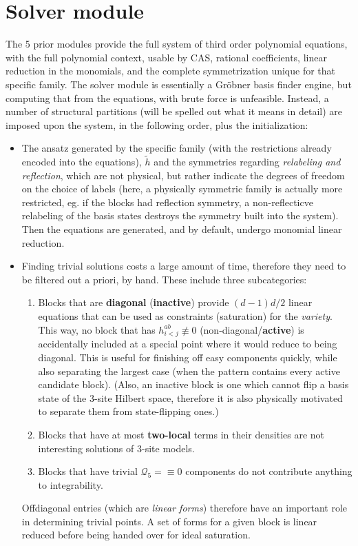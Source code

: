 \documentclass[a4paper, 11pt, twoside, onecolumn]{article}
\newcommand{\Q}{\mathcal{Q}}
\newcommand{\htil}{\tilde{h}}
\begin{document}
\section{Solver module}
The 5 prior modules provide the full system of third order polynomial equations, with the full polynomial context, usable by CAS, rational coefficients, linear reduction in the monomials, and the complete symmetrization unique for that specific family. The solver module is essentially a Gröbner basis finder engine, but computing that from the equations, with brute force is unfeasible. Instead, a number of structural partitions (will be spelled out what it means in detail) are imposed upon the system, in the following order, plus the initialization:
\begin{itemize}
    \item The ansatz generated by the specific family (with the restrictions already encoded into the equations), $\htil$ and the symmetries regarding \textit{relabeling and reflection}, which are not physical, but rather indicate the degrees of freedom on the choice of labels (here, a physically symmetric family is actually more restricted, eg. if the blocks had reflection symmetry, a non-reflecticve relabeling of the basis states destroys the symmetry built into the system). Then the equations are generated, and by default, undergo monomial linear reduction.
    \item Finding trivial solutions costs a large amount of time, therefore they need to be filtered out a priori, by hand. These include three subcategories:
    \begin{enumerate}
        \item Blocks that are \textbf{diagonal} (\textbf{inactive}) provide $(d-1)d/2$ linear equations that can be used as constraints (saturation) for the \textit{variety}. This way, no block that has $h^{ab}_{i<j}\not \equiv 0$ (non-diagonal/\textbf{active}) is accidentally included at a special point where it would reduce to being diagonal. This is useful for finishing off easy components quickly, while also separating the largest case (when the pattern contains every active candidate block). (Also, an inactive block is one which cannot flip a basis state of the 3-site Hilbert space, therefore it is also physically motivated to separate them from state-flipping ones.)
        \item Blocks that have at most \textbf{two-local} terms in their densities are not interesting solutions of 3-site models.
        \item Blocks that have trivial $\Q_5=\equiv 0$ components do not contribute anything to integrability.
    \end{enumerate}
    Offdiagonal entries (which are \textit{linear forms}) therefore have an important role in determining trivial points. A set of forms for a given block is linear reduced before being handed over for ideal saturation.
\end{itemize}
\end{document}
